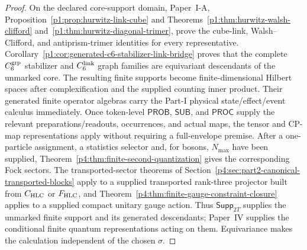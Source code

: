 \documentclass[12pt,a4paper]{article}
\begin{document}
\begin{proof}
On the declared core-support domain, Paper~I-A,
Proposition~\ref{p1:prop:hurwitz-link-cube} and
Theorems~\ref{p1:thm:hurwitz-walsh-clifford}
and~\ref{p1:thm:hurwitz-diagonal-trimer}, prove the cube-link,
Walsh--Clifford, and antiprism-trimer identities for every representative.
Corollary~\ref{p1:cor:generated-c6-stabilizer-link-bridge} proves that the
complete \(C_6^{\rm grp}\) stabilizer and \(C_6^{\rm link}\) graph families
are equivariant descendants of the unmarked core.  The resulting finite
supports become finite-dimensional Hilbert spaces after complexification and
the supplied counting inner product.  Their generated finite operator
algebras carry the Part-I physical state/effect/event calculus immediately.
Once token-level \(\mathsf{PROB}\), \(\mathsf{SUB}\), and \(\mathsf{PROC}\)
supply the relevant preparations/readouts, occurrences, and
actual maps, the tensor and CP-map representations apply without requiring a
full-envelope premise.
After a one-particle assignment, a statistics selector and, for bosons,
\(N_{\max}\) have been supplied,
Theorem~\ref{p4:thm:finite-second-quantization} gives the corresponding Fock
sectors.  The transported-sector theorems of
Section~\ref{p4:sec:part2-canonical-transported-blocks} apply to a supplied
transported rank-three projector built from \(C_{\rm HLC}\) or
\(F_{\rm HLC}\), and
Theorem~\ref{p4:thm:finite-gauge-constraint-closure} applies to a supplied
compact unitary gauge action.  Thus \(\mathsf{Supp}_{2T}\) supplies the
unmarked finite support and its generated descendants; Paper~IV supplies the
conditional finite quantum representations acting on them.  Equivariance
makes the calculation independent of the chosen \(\sigma\).
\end{proof}
\end{document}
